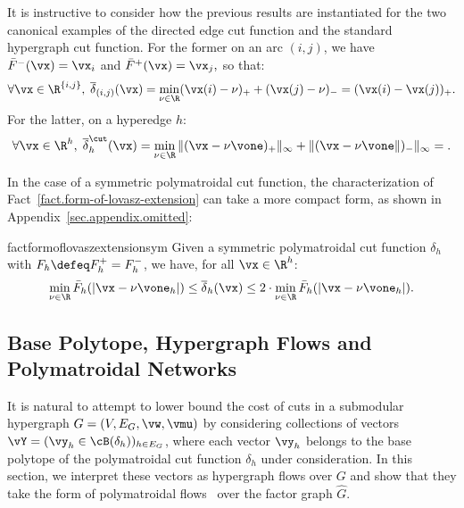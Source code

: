\documentclass[letterpaper]{article}
\begin{document}
It is instructive to consider how the previous results are instantiated for the two canonical examples of the directed edge cut function and the standard hypergraph cut function.
For the former on an arc $(i,j)$, we have $\bar{F}^{-}(\vx) = \vx_i$ and $\bar{F}^{+}(\vx) = \vx_j,$ so that:
$$
\forall \vx \in \R^{\{i,j\}} ,\; \overline{\delta}_{(i,j)} (\vx) = \min_{\nu \in \R} (\vx(i)-\nu)_{+} + (\vx(j)-\nu)_{-} = (\vx(i) - \vx(j))_+ .
$$
For the latter, on a hyperedge $h$:
$$
\forall \vx \in \R^h ,\;
\overline{\delta}^{\cut}_h(\vx )
= \min_{\nu \in \R} \|(\vx - \nu \vone)_{+}\|_\infty + \|(\vx - \nu \vone\|)_{-}\|_\infty = .
$$

In the case of a symmetric polymatroidal cut function, the characterization of Fact~\ref{fact.form-of-lovasz-extension} can take a more compact form, as shown in Appendix~\ref{sec.appendix.omitted}:
\begin{restatable}{fact}{formoflovaszextensionsym}
\label{fact.lovasz-extension-symmetric}
    Given a symmetric polymatroidal cut function $\delta_h$ with $F_h \defeq F^+_h = F^-_h$, we have, for all $\vx \in \R^h$:
    \[
        \min_{\nu \in \R} \bar{F}_h(|\vx - \nu \vone_h|) \leq \overline{\delta}_h(\vx) \leq 2 \cdot   \min_{\nu \in \R} \bar{F}_h(|\vx - \nu \vone_h|).
    \]
\end{restatable}

\subsection{Base Polytope, Hypergraph Flows and Polymatroidal Networks}
\label{sec.hypergraph-flows}

It is natural to attempt to lower bound the cost of cuts in a submodular hypergraph $G=(V,E_G, \vw, \vmu)$ by considering collections of vectors $\vY = (\vy_h \in \cB(\delta_h))_{h \in E_G}$, where each vector $\vy_h$ belongs to the base polytope of the polymatroidal cut function $\delta_h$ under consideration. In this section, we interpret these vectors as hypergraph flows over $G$ and show that they take the form of polymatroidal flows~\cite{lawler1982computing,chekuri2012multicommodity} over the factor graph $\hat{G}$.
\end{document}
